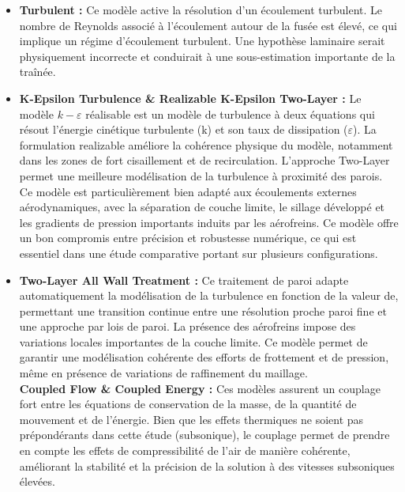 \vspace{0.4cm}

\begin{itemize}
    \item \textbf{Turbulent : } Ce modèle active la résolution d’un écoulement turbulent. Le nombre de Reynolds associé à
    l’écoulement autour de la fusée est élevé, ce qui implique un régime d’écoulement turbulent. Une hypothèse laminaire serait
    physiquement incorrecte et conduirait à une sous-estimation importante de la traînée.\\
    \item \textbf{K-Epsilon Turbulence \& Realizable K-Epsilon Two-Layer : } Le modèle $k-\varepsilon$ réalisable est un modèle de
    turbulence à deux équations qui résout l’énergie cinétique turbulente (k) et son taux de dissipation ($\varepsilon$). La
    formulation realizable améliore la cohérence physique du modèle, notamment dans les zones de fort cisaillement et de
    recirculation. L’approche Two-Layer permet une meilleure modélisation de la turbulence à proximité des parois. Ce modèle est
    particulièrement bien adapté aux écoulements externes aérodynamiques, avec la séparation de couche limite, le sillage
    développé et les gradients de pression importants induits par les aérofreins. Ce modèle offre un bon compromis entre
    précision et robustesse numérique, ce qui est essentiel dans une étude comparative portant sur plusieurs configurations.\\
    \item \textbf{Two-Layer All  Wall Treatment : } Ce traitement de paroi adapte automatiquement la modélisation de la turbulence
    en fonction de la valeur de, permettant une transition continue entre une résolution proche paroi fine et une approche par
    lois de paroi. La présence des aérofreins impose des variations locales importantes de la couche limite. Ce modèle permet de
    garantir une modélisation cohérente des efforts de frottement et de pression, même en présence de variations de raffinement
    du maillage.\\
    \textbf{Coupled Flow \& Coupled Energy : } Ces modèles assurent un couplage fort entre les équations de conservation de la
    masse, de la quantité de mouvement et de l’énergie. Bien que les effets thermiques ne soient pas prépondérants dans cette
    étude (subsonique), le couplage permet de prendre en compte les effets de compressibilité de l’air de manière cohérente,
    améliorant la stabilité et la précision de la solution à des vitesses subsoniques élevées.\\

\end{itemize}
